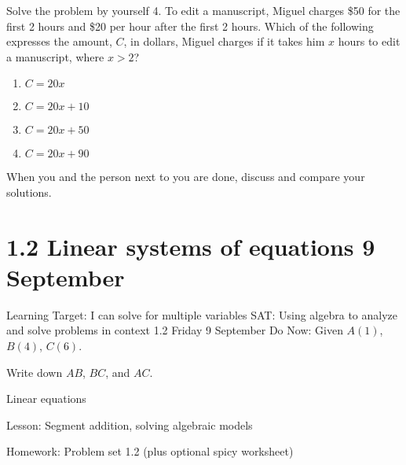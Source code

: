 \documentclass[onlytextwidth]{beamer}
\begin{document}
\begin{frame}{Solve the problem by yourself}
  4. To edit a manuscript, Miguel charges \$50 for the first 2 hours and \$20 per hour after the first 2 hours. Which of the following expresses the amount, $C$, in dollars, Miguel charges if it takes him $x$ hours to edit a manuscript, where $x>2$?
  \begin{enumerate}
    \item $C=20x$
    \item $C=20x+10$
    \item $C=20x+50$
    \item $C=20x+90$
  \end{enumerate} \vspace{1cm}
  When you and the person next to you are done, discuss and compare your solutions.
\end{frame}
  
\section{1.2 Linear systems of equations \hfill 9 September}
\begin{frame}{Learning Target: I can solve for multiple variables}
  {SAT: Using algebra to analyze and solve problems in
  context \hfill \alert{1.2 Friday 9 September}}
  Do Now: Given $A(1)$, $B(4)$, $C(6)$. \par \medskip
  Write down $AB$, $BC$, and $AC$.
  \begin{center}
    \item Linear equations
  \end{center} \vspace{1cm}
  Lesson: Segment addition, solving algebraic models \par \medskip
  Homework: Problem set 1.2 (plus optional spicy worksheet)
  \end{frame}
\end{document}
